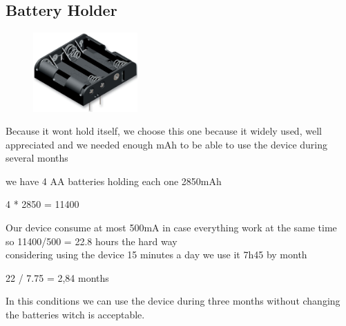 \documentclass[12pt,a4paper,landscape]{article}
\begin{document}
\begin{multicols}{2}
			\vspace{4cm}
	\subsection*{Battery Holder}
			\begin{figure}[H]
			\centering
			\includegraphics[width=4cm]{images/battery_holder.png} 
			\end{figure}
			Because it wont hold itself, we choose this one because it widely used, well appreciated and we needed enough mAh to be able to use the device during several months 

			we have 4 AA batteries holding each one 2850mAh 

			4 * 2850 = 11400 

			Our device consume at most 500mA in case everything work at the same time\\

			so 11400/500 = 22.8 hours the hard way\\

			considering using the device 15 minutes a day we use it 7h45 by month 

			 22 / 7.75 = 2,84 months 

			In this conditions we can use the device during three months without changing the batteries witch is acceptable.
	\end{multicols}
\end{document}

